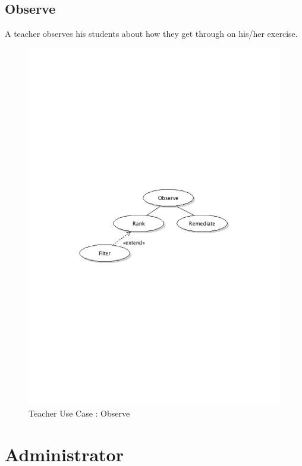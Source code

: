 	\subsection{Observe}
		A teacher observes his students about how they get through on his/her exercise.
		\begin{figure}[ht]
			\begin{center}
				\includegraphics[width=\textwidth,  trim=2cm 10cm 2cm 11cm]{UML_figure/UC/teacher/UC_Teacher_Observe.pdf}
				\caption{Teacher Use Case : Observe}
			\end{center}
		\end{figure}
\newpage
\section{Administrator}
